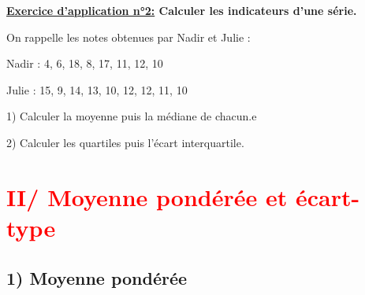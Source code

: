 \documentclass[12pt]{article}
\begin{document}
\begin{mdframed}[
    linewidth=1pt,
    roundcorner=5pt,
    linecolor=RoyalBlue,
    innertopmargin=10pt,
    innerbottommargin=10pt
]
{\color{RoyalBlue}
\textbf{\underline{Exercice d'application n°2:} Calculer les indicateurs d'une série.}}

\vspace{5pt}
On rappelle les notes obtenues par Nadir et Julie : 

\vspace{5pt}
Nadir : 4, 6, 18, 8, 17, 11, 12, 10

\vspace{5pt}
Julie : 15, 9, 14, 13, 10, 12, 12, 11, 10

\vspace{5pt}
\hspace{1cm}1) Calculer la moyenne puis la médiane de chacun.e 

\hspace{1cm}2) Calculer les quartiles puis l'écart interquartile.

\vspace{0.5cm}
{\color{black!45}\dotfill}

\vspace{0.5cm}
{\color{black!45}\dotfill}

\vspace{0.5cm}
{\color{black!45}\dotfill}

\vspace{0.5cm}
{\color{black!45}\dotfill}

\vspace{0.5cm}
{\color{black!45}\dotfill}

\vspace{20pt}

\end{mdframed}

\vspace{10pt}
\section*{\textcolor{red}{II/ Moyenne pondérée et écart-type}}

\vspace{5pt}
\subsection*{\hspace{1cm} 1) Moyenne pondérée}
\vspace{5pt}
\end{document}
